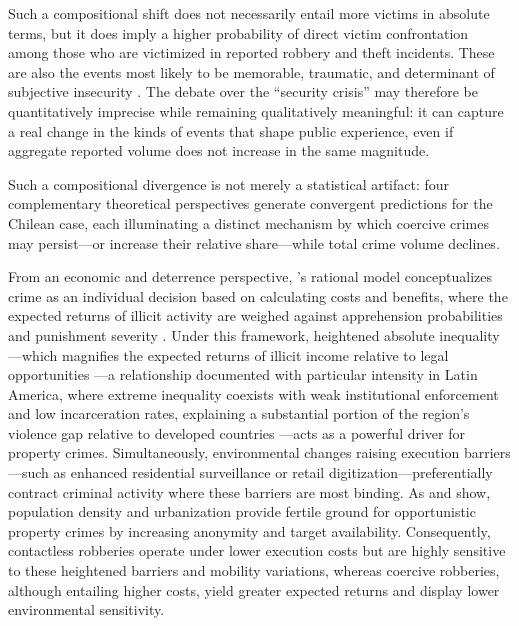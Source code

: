 \documentclass[pdflatex,sn-basic]{sn-jnl}
\begin{document}
Such a compositional shift does not necessarily entail more victims in absolute terms, but it does imply a higher probability of direct victim confrontation among those who are victimized in reported robbery and theft incidents. These are also the events most likely to be memorable, traumatic, and determinant of subjective insecurity \citep{dominguez2024,gamarra2024b}. The debate over the ``security crisis'' may therefore be quantitatively imprecise while remaining qualitatively meaningful: it can capture a real change in the kinds of events that shape public experience, even if aggregate reported volume does not increase in the same magnitude.

Such a compositional divergence is not merely a statistical artifact: four complementary theoretical perspectives generate convergent predictions for the Chilean case, each illuminating a distinct mechanism by which coercive crimes may persist---or increase their relative share---while total crime volume declines.

From an economic and deterrence perspective, \citet{becker1968}'s rational model conceptualizes crime as an individual decision based on calculating costs and benefits, where the expected returns of illicit activity are weighed against apprehension probabilities and punishment severity \citep{han2013,shamugia2024,yin2017}. Under this framework, heightened absolute inequality---which magnifies the expected returns of illicit income relative to legal opportunities \citep{goda2018}---a relationship documented with particular intensity in Latin America, where extreme inequality coexists with weak institutional enforcement and low incarceration rates, explaining a substantial portion of the region's violence gap relative to developed countries \citep{soares2010}---acts as a powerful driver for property crimes. Simultaneously, environmental changes raising execution barriers---such as enhanced residential surveillance or retail digitization---preferentially contract criminal activity where these barriers are most binding. As \citet{harries2006} and \citet{shahid2024} show, population density and urbanization provide fertile ground for opportunistic property crimes by increasing anonymity and target availability. Consequently, contactless robberies operate under lower execution costs but are highly sensitive to these heightened barriers and mobility variations, whereas coercive robberies, although entailing higher costs, yield greater expected returns and display lower environmental sensitivity.
\end{document}
